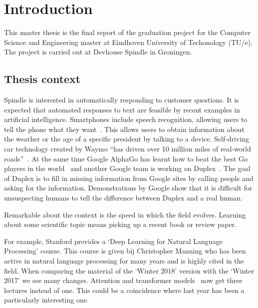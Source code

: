 \chapter{Introduction}
\label{ch:introduction}

\setcounter{page}{0}
This master thesis is the final report of the graduation project for the Computer Science and Engineering master at Eindhoven University of Techonology (TU/e).
The project is carried out at Devhouse Spindle in Groningen.

\section{Thesis context}
\label{sec:thesis_context}
Spindle is interested in automatically responding to customer questions.
It is expected that automated responses to text are feasible by recent examples in artificial intelligence.
Smartphones include speech recognition, allowing users to tell the phone what they want~\citep{lopez2017alexa}.
This allows users to obtain information about the weather or the age of a specific president by talking to a device.
Self-driving car technology created by Waymo ``has driven over 10 million miles of real-world roads''~\citep{waymo2018}.
At the same time Google AlphaGo has learnt how to beat the best Go players in the world~\citep{gibney2016google} and another Google team is working on Duplex~\citep{leviathan2018google}.
The goal of Duplex is to fill in missing information from Google sites by calling people and asking for the information.
Demonstrations by Google show that it is difficult for unsuspecting humans to tell the difference between Duplex and a real human.

\iffalse
Remarkable about the context is the speed in which the field evolves.
Learning about some scientific topic means picking up a recent book or review paper.

For example, Stanford provides a `Deep Learning for Natural Language Processing' course.
This course is given bij Christopher Manning who has been active in natural language processing for many years and is highly cited in the field.
When comparing the material of the `Winter 2018' version with the `Winter 2017' we see many changes.
Attention and transformer models~\citep{vaswani2017attention} now get three lectures instead of one.
This could be a coincidence where last year has been a particularly interesting one.

